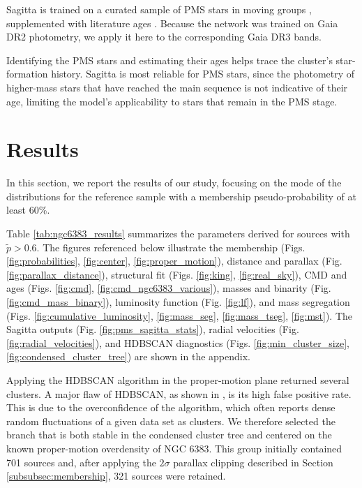 \documentclass{aa}
\begin{document}
Sagitta is trained on a curated sample of PMS stars in moving groups \citep{2020AJ....160..279K}, supplemented with literature ages \citep{2023AJ....165..182K}. Because the network was trained on Gaia DR2 photometry, we apply it here to the corresponding Gaia DR3 bands.

Identifying the PMS stars and estimating their ages helps trace the cluster's star-formation history. Sagitta is most reliable for PMS stars, since the photometry of higher-mass stars that have reached the main sequence is not indicative of their age, limiting the model's applicability to stars that remain in the PMS stage.

\section{Results}\label{sec:results}
In this section, we report the results of our study, focusing on the mode of the distributions for the reference sample with a membership pseudo-probability of at least $60$\%.

Table \ref{tab:ngc6383_results} summarizes the parameters derived for sources with $\tilde{p}>0.6$. The figures referenced below illustrate the membership (Figs. \ref{fig:probabilities}, \ref{fig:center}, \ref{fig:proper_motion}), distance and parallax (Fig. \ref{fig:parallax_distance}), structural fit (Figs. \ref{fig:king}, \ref{fig:real_sky}), CMD and ages (Figs. \ref{fig:cmd}, \ref{fig:cmd_ngc6383_various}), masses and binarity (Fig. \ref{fig:cmd_mass_binary}), luminosity function (Fig. \ref{fig:lf}), and mass segregation (Figs. \ref{fig:cumulative_luminosity}, \ref{fig:mass_seg}, \ref{fig:mass_tseg}, \ref{fig:mst}). The Sagitta outputs (Fig. \ref{fig:pms_sagitta_stats}), radial velocities (Fig. \ref{fig:radial_velocities}), and HDBSCAN diagnostics (Figs. \ref{fig:min_cluster_size}, \ref{fig:condensed_cluster_tree}) are shown in the appendix.

Applying the HDBSCAN algorithm in the proper-motion plane returned several clusters. A major flaw of HDBSCAN, as shown in \citet{2021A&A...646A.104H}, is its high false positive rate. This is due to the overconfidence of the algorithm, which often reports dense random fluctuations of a given data set as clusters. We therefore selected the branch that is both stable in the condensed cluster tree and centered on the known proper-motion overdensity of NGC 6383. This group initially contained 701 sources and, after applying the $2\sigma$ parallax clipping described in Section \ref{subsubsec:membership}, 321 sources were retained.
\end{document}

